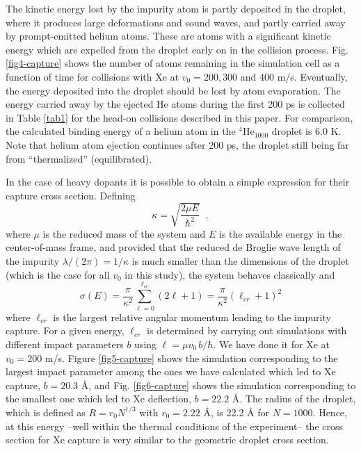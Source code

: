The kinetic energy lost by the impurity atom is partly deposited 
in the droplet, where it produces large deformations and sound waves, 
and partly carried away by   prompt-emitted helium atoms. These are atoms  with a 
significant kinetic energy which are expelled from the droplet  
early on in the collision process. 
Fig. \ref{fig4-capture}   shows the number of atoms remaining in the simulation cell as a function of time
for collisions with Xe at $v_0= 200, 300 $ and 400 m/s. 
Eventually, the energy deposited into the droplet should be lost by atom evaporation.
The energy carried away by the ejected He atoms during the first 200 ps is 
collected in Table \ref{tab1} for the head-on collisions described in this paper.
For comparison, the  calculated binding energy of  a helium atom in the $^4$He$_{1000}$ droplet is $6.0$ K.
Note that helium atom ejection continues after 200 ps, the droplet still being far from ``thermalized'' (equilibrated).

In the case of heavy dopants it is possible to obtain 
a simple expression for their capture cross 
section.  Defining
%
\begin{equation}
\kappa=\sqrt{\frac{2 \mu E}{\hbar^2}} \;\; ,
\label{eq9}
\end{equation}
%
where $\mu$ is the reduced mass of the system and
$E$ is the available energy in the center-of-mass frame, and 
provided that the reduced de Broglie wave length of the impurity
$\lambda/(2 \pi) = 1/\kappa$ is much smaller than the dimensions 
of the droplet (which is the case for all $v_0$  in this study), the system
behaves classically and \citep{Lea14a}
%
\begin{equation}
\sigma(E)= \frac{\pi}{\kappa^2 } \sum_{\ell=0}^{\ell_{cr}} (2 \ell
+1)= \frac{\pi}{\kappa^2 } (\ell_{cr} +1)^2  
\label{eq10}
\end{equation}
%
where $\ell_{cr}$ is the largest relative angular momentum leading to the impurity capture. 
For a given energy, $\ell_{cr}$ is determined by 
carrying out simulations with different impact parameters $b$ using  
$\ell= \mu v_0 \, b/\hbar$.
We have done it for Xe at $v_0= 200$ m/s. Figure \ref{fig5-capture} shows the 
simulation corresponding to the largest impact parameter among the ones we have calculated
which led to Xe capture, $b=20.3$ \AA{}, and
Fig. \ref{fig6-capture} shows the simulation corresponding to the smallest one
which led to Xe deflection, $b=22.2$ \AA{}.
The radius of the 
droplet, which is defined as $R= r_0 N^{1/3}$ 
with $r_0 = 2.22$ \AA{}, is 22.2 \AA{} for $N=1000$. 
Hence, at this energy --well within the thermal conditions of the experiment--
the cross section for Xe capture is very similar to the geometric droplet cross section. 

